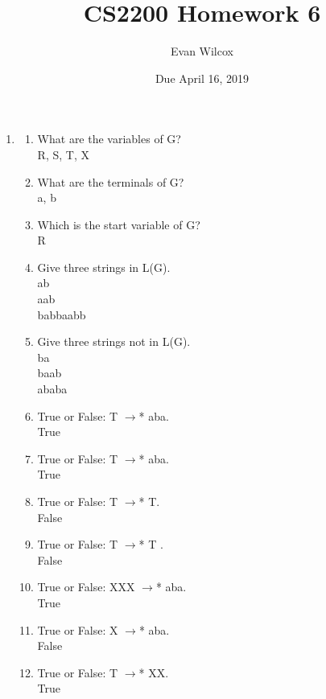\documentclass[a4paper]{article}
\title{CS2200 Homework 6}
\author{Evan Wilcox}
\date{Due April 16, 2019}
\begin{document}
  \maketitle

  \begin{enumerate}
    \item
    \begin{enumerate}
      
      \item What are the variables of G? \\ R, S, T, X

      \item What are the terminals of G? \\ a, b

      \item Which is the start variable of G? \\ R

      \item  Give three strings in L(G). \\ ab \\ aab \\ babbaabb

      \item Give three strings not in L(G). \\ ba \\ baab \\ ababa

      \item True or False: T $\rightarrow$* aba. \\ True

      \item True or False: T $\rightarrow$* aba. \\ True

      \item True or False: T  $\rightarrow$* T. \\ False

      \item True or False: T $\rightarrow$* T . \\ False

      \item True or False: XXX  $\rightarrow$* aba. \\ True

      \item True or False: X  $\rightarrow$* aba. \\ False

      \item True or False: T $\rightarrow$* XX. \\ True


\end{enumerate}
\end{enumerate}
\end{document}
